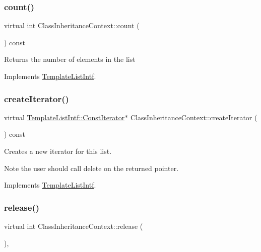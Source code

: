 \subsubsection{\texorpdfstring{count()}{count()}}
{\footnotesize\ttfamily virtual int Class\+Inheritance\+Context\+::count (\begin{DoxyParamCaption}{ }\end{DoxyParamCaption}) const\hspace{0.3cm}{\ttfamily [virtual]}}

Returns the number of elements in the list 

Implements \mbox{\hyperlink{class_template_list_intf_a329e49e33484c2aa5106aac1bf4e5216}{Template\+List\+Intf}}.

\mbox{\label{class_class_inheritance_context_a7affeabd7e388c7049fc5ebf01916e3f}} 
\subsubsection{\texorpdfstring{createIterator()}{createIterator()}}
{\footnotesize\ttfamily virtual \mbox{\hyperlink{class_template_list_intf_1_1_const_iterator}{Template\+List\+Intf\+::\+Const\+Iterator}}$\ast$ Class\+Inheritance\+Context\+::create\+Iterator (\begin{DoxyParamCaption}{ }\end{DoxyParamCaption}) const\hspace{0.3cm}{\ttfamily [virtual]}}

Creates a new iterator for this list. \begin{DoxyNote}{Note}
the user should call delete on the returned pointer. 
\end{DoxyNote}


Implements \mbox{\hyperlink{class_template_list_intf_a56b82384db24c3e121076a1da046d378}{Template\+List\+Intf}}.

\mbox{\label{class_class_inheritance_context_a4570bbdc5944d0c453971ec822106f9e}} 
\subsubsection{\texorpdfstring{release()}{release()}}
{\footnotesize\ttfamily virtual int Class\+Inheritance\+Context\+::release (\begin{DoxyParamCaption}{ }\end{DoxyParamCaption})\hspace{0.3cm}{\ttfamily [inline]}, {\ttfamily [virtual]}}


